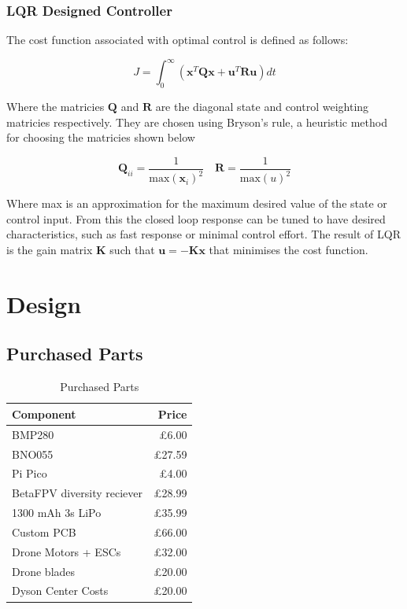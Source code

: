 \documentclass{article}
\begin{document}
\subsubsection{LQR Designed Controller}

The cost function associated with optimal control is defined as follows:

\begin{equation}
  J = \int_0^\infty \left( \mathbf{x}^T \mathbf{Q} \mathbf{x} + \mathbf{u}^T \mathbf{R} \mathbf{u} \right) dt
\end{equation}

Where the matricies $\mathbf{Q}$ and $\mathbf{R}$ are the diagonal state and control weighting matricies respectively.
They are chosen using Bryson's rule, a heuristic method for choosing the matricies shown below \cite{feedback_control_of_dynamic_systems}

\begin{equation}
  \mathbf{Q}_{ii} = \frac{1}{\text{max}(\mathbf{x}_i)^2} \quad \mathbf{R} = \frac{1}{\text{max}(u)^2}
\end{equation}

Where max is an approximation for the maximum desired value of the state or control input.
From this the closed loop response can be tuned to have desired characteristics, such as fast response or minimal control effort.
The result of LQR is the gain matrix $\mathbf{K}$ such that $\mathbf{u} = -\mathbf{Kx}$ that minimises the cost function.

\section{Design}

\subsection{Purchased Parts}

\begin{table}[H]
    \centering
    \begin{tabular}{|l|r|}
        \hline
        Component & Price \\
        \hline
        BMP280 & £6.00 \\
        BNO055 & £27.59 \\
        Pi Pico & £4.00 \\
        BetaFPV diversity reciever & £28.99 \\
        1300 mAh 3s LiPo & £35.99 \\
        Custom PCB & £66.00 \\
        Drone Motors + ESCs & £32.00 \\
        Drone blades & £20.00 \\
        Dyson Center Costs & £20.00 \\
        \hline
    \end{tabular}
    \caption{Purchased Parts}
\end{table}
\end{document}
